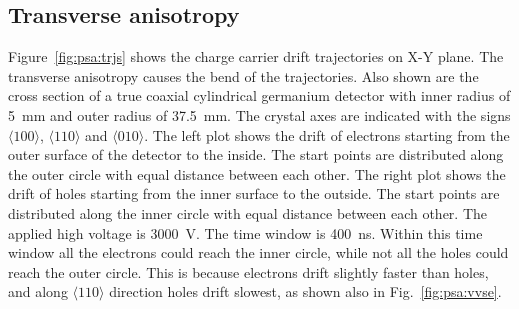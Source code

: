 \subsection{Transverse anisotropy}
\label{sec:psa:tran}
Figure~\ref{fig:psa:trjs} shows the charge carrier drift trajectories on X-Y plane. The transverse anisotropy causes the bend of the trajectories. Also shown are the cross section of a true coaxial cylindrical germanium detector with inner radius of 5~mm and outer radius of 37.5~mm. The crystal axes are indicated with the signs $\langle 100 \rangle$, $\langle 110 \rangle$ and $\langle 010 \rangle$. The left plot shows the drift of electrons starting from the outer surface of the detector to the inside. The start points are distributed along the outer circle with equal distance between each other. The right plot shows the drift of holes starting from the inner surface to the outside. The start points are distributed along the inner circle with equal distance between each other. The applied high voltage is 3000~V. The time window is 400~ns. Within this time window all the electrons could reach the inner circle, while not all the holes could reach the outer circle.  This is because electrons drift slightly faster than holes, and along $\langle 110 \rangle$ direction holes drift slowest, as shown also in Fig.~\ref{fig:psa:vvse}.
